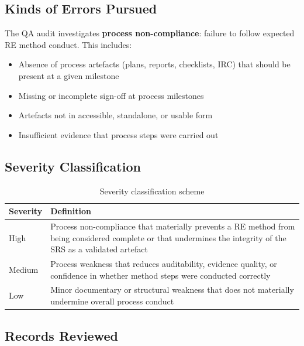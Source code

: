 \documentclass[11pt,a4paper]{article}
\begin{document}
\subsection{Kinds of Errors Pursued}

The QA audit investigates \textbf{process non-compliance}: failure to follow expected RE method conduct. This includes:

\begin{itemize}[leftmargin=*]
\item Absence of process artefacts (plans, reports, checklists, IRC) that should be present at a given milestone
\item Missing or incomplete sign-off at process milestones
\item Artefacts not in accessible, standalone, or usable form
\item Insufficient evidence that process steps were carried out
\end{itemize}

\subsection{Severity Classification}

\begin{table}[H]
\centering
\small
\renewcommand{\arraystretch}{1.4}
\begin{tabularx}{\textwidth}{|p{}|X|}
\hline
\rowcolor{tableheader}
\textbf{Severity} & \textbf{Definition} \\
\hline
\rowcolor{highsev}
High & Process non-compliance that materially prevents a RE method from being considered complete or that undermines the integrity of the SRS as a validated artefact \\
\hline
\rowcolor{medsev}
Medium & Process weakness that reduces auditability, evidence quality, or confidence in whether method steps were conducted correctly \\
\hline
\rowcolor{lowsev}
Low & Minor documentary or structural weakness that does not materially undermine overall process conduct \\
\hline
\end{tabularx}
\caption{Severity classification scheme}
\label{tab:severity}
\end{table}

\subsection{Records Reviewed}
\end{document}
